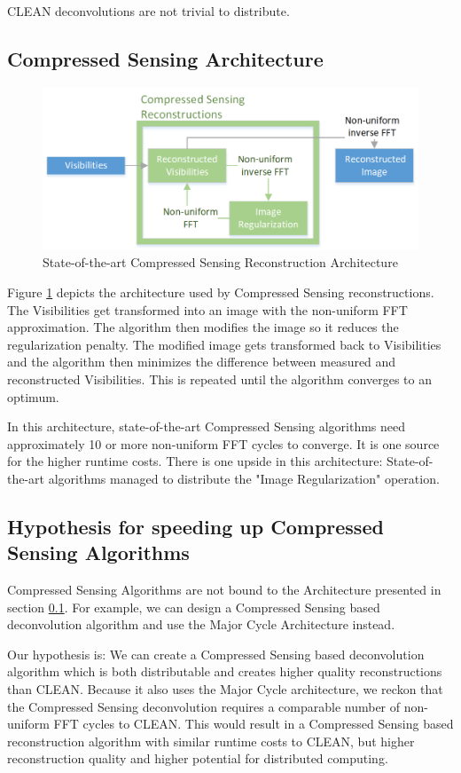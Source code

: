 CLEAN deconvolutions are not trivial to distribute.


\subsection{Compressed Sensing Architecture}\label{hypo:CSArch}

\begin{figure}[h]
	\centering
	\includegraphics[width=0.80\linewidth]{./chapters/02.hypo/CS.png}
	\caption{State-of-the-art Compressed Sensing Reconstruction Architecture}
	\label{hypo:cs}
\end{figure}

Figure \ref{hypo:cs} depicts the architecture used by Compressed Sensing reconstructions. The Visibilities get transformed into an image with the non-uniform FFT approximation. The algorithm then modifies the image so it reduces the regularization penalty. The modified image gets transformed back to Visibilities and the algorithm then minimizes the difference between measured and reconstructed Visibilities. This is repeated until the algorithm converges to an optimum.

In this architecture, state-of-the-art Compressed Sensing algorithms need approximately 10 or more non-uniform FFT cycles to converge. It is one source for the higher runtime costs. There is one upside in this architecture: State-of-the-art algorithms managed to distribute the "Image Regularization" operation.

\subsection{Hypothesis for speeding up Compressed Sensing Algorithms}
Compressed Sensing Algorithms are not bound to the Architecture presented in section \ref{hypo:CSArch}. For example, we can design a Compressed Sensing based deconvolution algorithm and use the Major Cycle Architecture instead.

Our hypothesis is: We can create a Compressed Sensing based deconvolution algorithm which is both distributable and creates higher quality reconstructions than CLEAN. Because it also uses the Major Cycle architecture, we reckon that the Compressed Sensing deconvolution requires a comparable number of non-uniform FFT cycles to CLEAN. This would result in a Compressed Sensing based reconstruction algorithm with similar runtime costs to CLEAN, but higher reconstruction quality and higher potential for distributed computing.


